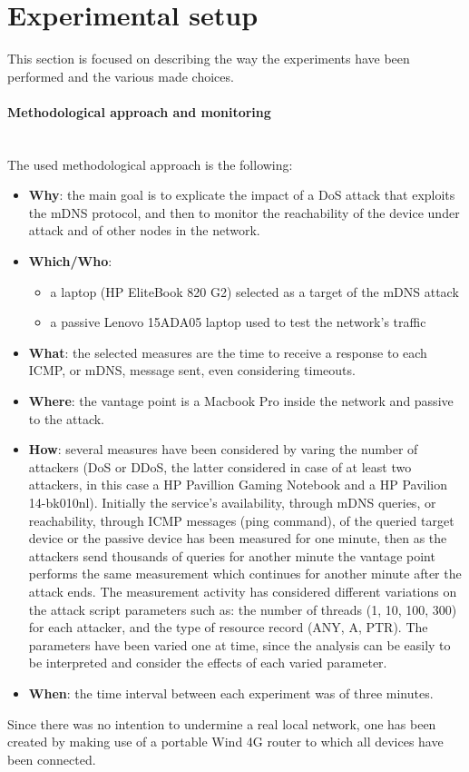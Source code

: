 \documentclass[fleqn, 11pt]{SelfArx} %
\begin{document}
\section{Experimental setup}
This section is focused on describing the way the experiments have been performed and the various made choices.

\paragraph{Methodological approach and monitoring}\mbox{}\\
The used methodological approach is the following:
\begin{itemize}[leftmargin=*]
	\item \textbf{Why}: the main goal is to explicate the impact of a DoS attack that exploits the mDNS protocol, and then to monitor the reachability of the device under attack and of other nodes in the network.
	\item \textbf{Which/Who}:
\begin{itemize}[leftmargin=*, noitemsep, topsep=0pt]
    \item a laptop (HP EliteBook 820 G2) selected as a target of the mDNS attack
    \item a passive Lenovo 15ADA05 laptop used to test the network's traffic
\end{itemize}
	\item \textbf{What}: the selected measures are the time to receive a response to each ICMP, or mDNS, message sent, even considering timeouts.
	\item \textbf{Where}: the vantage point is a Macbook Pro inside the network and passive to the attack.
	\item \textbf{How}: several measures have been considered by varing the number of attackers (DoS or DDoS, the latter considered in case of at least two attackers, in this case a HP Pavillion Gaming Notebook and a HP Pavilion 14-bk010nl). Initially the service's availability, through mDNS queries, or reachability, through ICMP messages (ping command), of the queried target device or the passive device has been measured for one minute, then as the attackers send thousands of queries for another minute the vantage point performs the same measurement which continues for another minute after the attack ends. \newline
The measurement activity has considered different variations on the attack script parameters such as: the number of threads (1, 10, 100, 300) for each attacker, and the type of resource record (ANY, A, PTR). The parameters have been varied one at time, since the analysis can be easily to be interpreted and consider the effects of each varied parameter.
\item \textbf{When}: the time interval between each experiment was of three minutes.
\end{itemize}
Since there was no intention to undermine a real local network, one has been created by making use of a portable Wind 4G router \cite{RouterSpecs} to which all devices have been connected.
\end{document}
